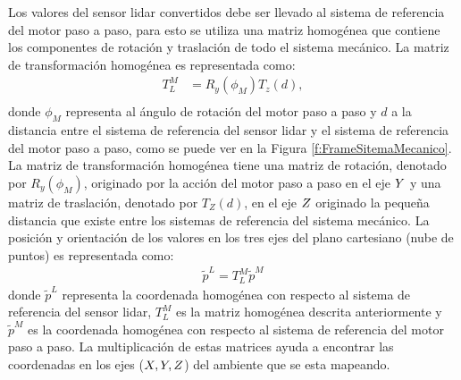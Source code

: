 Los valores del sensor lidar convertidos debe ser llevado al sistema de referencia del motor paso a 
paso, para esto se utiliza una matriz homogénea que contiene los componentes de rotación y traslación
de todo el sistema mecánico. La matriz de transformación homogénea es representada como:
\begin{align*}
	T_{L}^{M} &= R_{y}(\phi_{M}) T_{z}(d), \\
\end{align*}
donde $\phi_{M}$ representa al ángulo de rotación del motor paso a paso y $d$ a la distancia entre el 
sistema de referencia del sensor lidar y el sistema de referencia del motor paso a paso, como se 
puede ver en la Figura \ref{f:FrameSitemaMecanico}. La matriz  de transformación homogénea
tiene una matriz de rotación, denotado por $R_{y}(\phi_{M})$, originado por la acción del 
motor paso a paso en el eje $\mathnormal Y$ y una matriz de traslación, denotado por $T_{Z}(d)$, en el 
eje $\mathnormal Z$ originado la pequeña distancia que existe entre los sistemas de referencia 
del sistema mecánico. La posición y orientación de los valores en los tres ejes del plano
cartesiano (nube de puntos) es representada como:
\begin{align}
	\tilde{p}^{L} = T_{L}^{M} \tilde{p}^{M}
	\label{eqn:MatrizHomogenea}
\end{align}
donde $\tilde{p}^{L}$ representa la coordenada homogénea con respecto al sistema de referencia del sensor
lidar, $T_{L}^{M}$ es la matriz homogénea descrita anteriormente y $\tilde{p}^{M}$ es la coordenada 
homogénea con respecto al sistema de referencia del motor paso a paso. La multiplicación de estas matrices
ayuda a encontrar las coordenadas en los ejes ($\mathnormal X,\mathnormal Y,\mathnormal Z$) del ambiente
que se esta mapeando.

